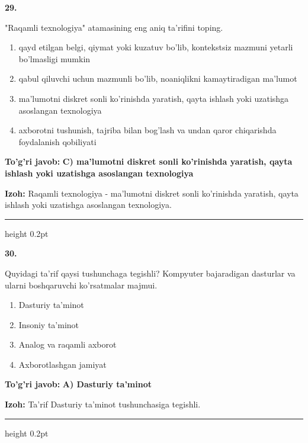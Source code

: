\documentclass[10pt,a4paper,oneside]{article}
\begin{document}
\noindent\textbf{\color{ink}29.}
\par
"Raqamli texnologiya" atamasining eng aniq ta'rifini toping.
\begin{enumerate}[label=\Alph*),leftmargin=9mm]
\item qayd etilgan belgi, qiymat yoki kuzatuv bo'lib, kontekstsiz mazmuni yetarli bo'lmasligi mumkin
\item qabul qiluvchi uchun mazmunli bo'lib, noaniqlikni kamaytiradigan ma'lumot
\item ma'lumotni diskret sonli ko'rinishda yaratish, qayta ishlash yoki uzatishga asoslangan texnologiya
\item axborotni tushunish, tajriba bilan bog'lash va undan qaror chiqarishda foydalanish qobiliyati
\end{enumerate}
\begin{tcolorbox}[enhanced,breakable,colback=teal!4,colframe=teal!50!black,boxrule=0.5pt,arc=1.1mm,left=3mm,right=3mm,top=1.7mm,bottom=1.7mm,before skip=2mm,after skip=2mm]
\textbf{\color{teal}To'g'ri javob:} \textbf{C) ma'lumotni diskret sonli ko'rinishda yaratish, qayta ishlash yoki uzatishga asoslangan texnologiya}
\par\smallskip
\textbf{Izoh:} Raqamli texnologiya - ma'lumotni diskret sonli ko'rinishda yaratish, qayta ishlash yoki uzatishga asoslangan texnologiya.
\end{tcolorbox}
\vspace{2mm}\hrule height 0.2pt \vspace{3mm}

\noindent\textbf{\color{ink}30.}
\par
Quyidagi ta'rif qaysi tushunchaga tegishli? Kompyuter bajaradigan dasturlar va ularni boshqaruvchi ko'rsatmalar majmui.
\begin{enumerate}[label=\Alph*),leftmargin=9mm]
\item Dasturiy ta'minot
\item Insoniy ta'minot
\item Analog va raqamli axborot
\item Axborotlashgan jamiyat
\end{enumerate}
\begin{tcolorbox}[enhanced,breakable,colback=teal!4,colframe=teal!50!black,boxrule=0.5pt,arc=1.1mm,left=3mm,right=3mm,top=1.7mm,bottom=1.7mm,before skip=2mm,after skip=2mm]
\textbf{\color{teal}To'g'ri javob:} \textbf{A) Dasturiy ta'minot}
\par\smallskip
\textbf{Izoh:} Ta'rif Dasturiy ta'minot tushunchasiga tegishli.
\end{tcolorbox}
\vspace{2mm}\hrule height 0.2pt \vspace{3mm}
\end{document}
